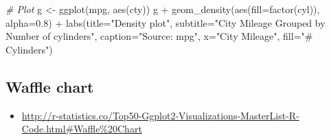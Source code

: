 \documentclass[
]{book}
\newenvironment{Shaded}{\begin{snugshade}}{\end{snugshade}}
\newcommand{\AttributeTok}[1]{\textcolor[rgb]{0.77,0.63,0.00}{#1}}
\newcommand{\CommentTok}[1]{\textcolor[rgb]{0.56,0.35,0.01}{\textit{#1}}}
\newcommand{\FloatTok}[1]{\textcolor[rgb]{0.00,0.00,0.81}{#1}}
\newcommand{\FunctionTok}[1]{\textcolor[rgb]{0.00,0.00,0.00}{#1}}
\newcommand{\NormalTok}[1]{#1}
\newcommand{\OtherTok}[1]{\textcolor[rgb]{0.56,0.35,0.01}{#1}}
\newcommand{\SpecialCharTok}[1]{\textcolor[rgb]{0.00,0.00,0.00}{#1}}
\newcommand{\StringTok}[1]{\textcolor[rgb]{0.31,0.60,0.02}{#1}}
\providecommand{\tightlist}{%
  \setlength{\itemsep}{0pt}\setlength{\parskip}{0pt}}
\begin{document}
\begin{Shaded}
\begin{Highlighting}[]
\CommentTok{\# Plot}
\NormalTok{g }\OtherTok{\textless{}{-}} \FunctionTok{ggplot}\NormalTok{(mpg, }\FunctionTok{aes}\NormalTok{(cty))}
\NormalTok{g }\SpecialCharTok{+} \FunctionTok{geom\_density}\NormalTok{(}\FunctionTok{aes}\NormalTok{(}\AttributeTok{fill=}\FunctionTok{factor}\NormalTok{(cyl)), }\AttributeTok{alpha=}\FloatTok{0.8}\NormalTok{) }\SpecialCharTok{+} 
    \FunctionTok{labs}\NormalTok{(}\AttributeTok{title=}\StringTok{"Density plot"}\NormalTok{, }
         \AttributeTok{subtitle=}\StringTok{"City Mileage Grouped by Number of cylinders"}\NormalTok{,}
         \AttributeTok{caption=}\StringTok{"Source: mpg"}\NormalTok{,}
         \AttributeTok{x=}\StringTok{"City Mileage"}\NormalTok{,}
         \AttributeTok{fill=}\StringTok{"\# Cylinders"}\NormalTok{)}
\end{Highlighting}
\end{Shaded}

\hypertarget{waffle-chart}{%
\subsection{Waffle chart}\label{waffle-chart}}

\begin{itemize}
\tightlist
\item
  \url{http://r-statistics.co/Top50-Ggplot2-Visualizations-MasterList-R-Code.html\#Waffle\%20Chart}
\end{itemize}
\end{document}
